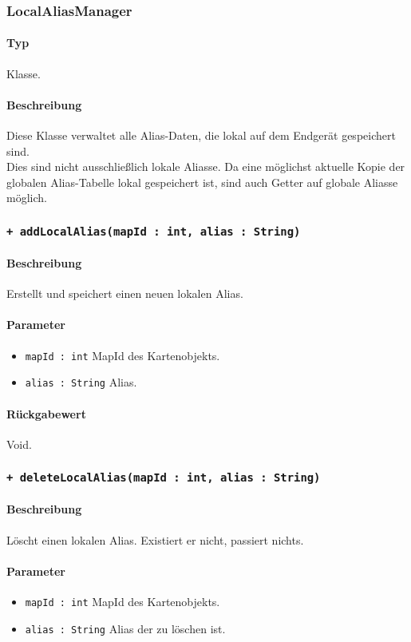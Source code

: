 \subsubsection{LocalAliasManager}
\paragraph*{Typ}
Klasse.
\paragraph*{Beschreibung}
Diese Klasse verwaltet alle Alias-Daten, die lokal auf dem Endgerät gespeichert sind.\\
Dies sind nicht ausschließlich lokale Aliasse. Da eine möglichst aktuelle Kopie der 
globalen Alias-Tabelle lokal gespeichert ist, sind auch Getter auf globale Aliasse möglich.

\subsubsection*{\texttt{+ addLocalAlias(mapId : int, alias : String)}}%
\paragraph*{Beschreibung}
Erstellt und speichert einen neuen lokalen Alias.
\paragraph*{Parameter}
\begin{itemize}
    \item \texttt{mapId : int} MapId des Kartenobjekts.
    \item \texttt{alias : String} Alias.
\end{itemize}
\paragraph*{Rückgabewert}
Void.

\subsubsection*{\texttt{+ deleteLocalAlias(mapId : int, alias : String)}}%
\paragraph*{Beschreibung}
Löscht einen lokalen Alias. Existiert er nicht, passiert nichts.
\paragraph*{Parameter}
\begin{itemize}
    \item \texttt{mapId : int} MapId des Kartenobjekts.
    \item \texttt{alias : String} Alias der zu löschen ist.
\end{itemize}
